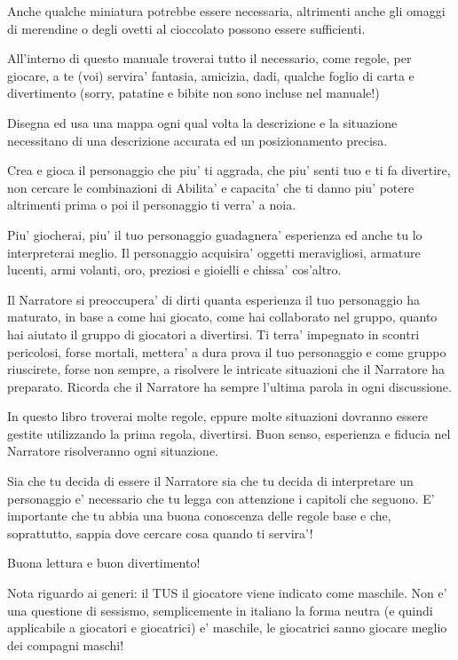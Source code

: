 \documentclass[a4paper,11pt,twoside,openany]{book}
\begin{document}
Anche qualche miniatura potrebbe essere necessaria, altrimenti anche gli omaggi di merendine o degli ovetti al cioccolato possono essere sufficienti.

All'interno di questo manuale troverai tutto il necessario, come regole, per giocare, a te (voi) servira' fantasia, amicizia, dadi, qualche foglio di carta e divertimento (sorry, patatine e bibite non sono incluse nel manuale!)

Disegna ed usa una mappa ogni qual volta la descrizione e la situazione necessitano di una descrizione accurata ed un posizionamento precisa. 

Crea e gioca il personaggio che piu' ti aggrada, che piu' senti tuo e ti fa divertire, non cercare le combinazioni di Abilita' e capacita' che ti danno piu' potere altrimenti prima o poi il personaggio ti verra' a noia.

Piu' giocherai, piu' il tuo personaggio guadagnera' esperienza ed anche tu lo interpreterai meglio. Il personaggio acquisira' oggetti meravigliosi, armature lucenti, armi volanti, oro, preziosi e gioielli e chissa' cos'altro.

Il Narratore si preoccupera' di dirti quanta esperienza il tuo personaggio ha maturato, in base a come hai giocato, come hai collaborato nel gruppo, quanto hai aiutato il gruppo di giocatori a divertirsi. Ti terra' impegnato in scontri pericolosi, forse mortali, mettera' a dura prova il tuo personaggio e come gruppo riuscirete, forse non sempre, a risolvere le intricate situazioni che il Narratore ha preparato. Ricorda che il Narratore ha sempre l'ultima parola in ogni discussione.

In questo libro troverai molte regole, eppure molte situazioni dovranno essere gestite utilizzando la prima regola, divertirsi. Buon senso, esperienza e fiducia nel Narratore risolveranno ogni situazione.

Sia che tu decida di essere il Narratore sia che tu decida di interpretare un personaggio e' necessario che tu legga con attenzione i capitoli che seguono.
E' importante che tu abbia una buona conoscenza delle regole base e che, soprattutto, sappia dove cercare cosa quando ti servira'!

Buona lettura e buon divertimento!

Nota riguardo ai generi: il TUS il giocatore viene indicato come maschile. Non e' una questione di sessismo, semplicemente in italiano la forma neutra (e quindi applicabile a giocatori e giocatrici) e' maschile, le giocatrici sanno giocare meglio dei compagni maschi!
\end{document}
